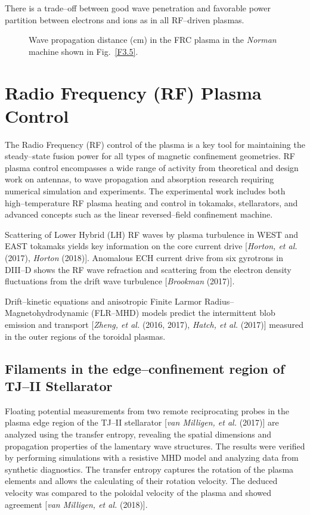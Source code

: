 \documentclass[a4paper,openany,12pt]{book}
\begin{document}
There is a trade--off between good wave penetration and favorable power partition between electrons and ions as in all RF--driven plasmas.
%
\begin{figure}[H]
\centerline{}
\caption{Wave propagation distance (cm) in the FRC plasma in the \emph{Norman} machine shown in Fig.~\ref{F3.5}.}
\label{F3.8}
\end{figure}
%

\section{Radio Frequency (RF) Plasma Control}

The Radio Frequency (RF) control of the plasma is a key tool for maintaining the steady--state fusion power for all types of magnetic confinement geometries. RF plasma control encompasses a wide range of activity from theoretical and design work on antennas, to wave propagation and absorption research requiring numerical simulation and experiments. The experimental work includes both high--temperature RF plasma heating and control in tokamaks, stellarators, and advanced concepts such as the linear reversed--field confinement machine.

Scattering of Lower Hybrid (LH) RF waves by plasma turbulence in WEST and EAST tokamaks yields key information on the core current drive [\emph{Horton, et al.} (2017), \emph{Horton} (2018)]. Anomalous ECH current drive from six gyrotrons in DIII--D shows the RF wave refraction and scattering from the electron density fluctuations from the drift wave turbulence [\emph{Brookman} (2017)].

Drift--kinetic equations and anisotropic Finite Larmor Radius--Magnetohydrodynamic (FLR--MHD) models predict the intermittent blob emission and transport [\emph{Zheng, et al.} (2016, 2017), \emph{Hatch, et al.} (2017)] measured in the outer regions of the toroidal plasmas.

\subsection{Filaments in the edge--confinement region of TJ--II Stellarator}

Floating potential measurements from two remote reciprocating probes in the plasma edge region of the TJ--II stellarator 
[\emph{van Milligen, et al.} (2017)] are analyzed using the transfer entropy, revealing the spatial dimensions and propagation properties of the lamentary wave structures. The results were verified by performing simulations with a resistive MHD model and analyzing data from synthetic diagnostics. The transfer entropy captures the rotation of the plasma elements and allows the calculating of their rotation velocity. The deduced velocity was compared to the poloidal velocity of the plasma and showed agreement [\emph{van Milligen, et al.} (2018)].
\end{document}
